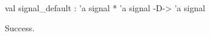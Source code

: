 \chklistingtrue
{}
\begin{ChkListingMsg}
val signal_default : 'a signal * 'a signal -D-> 'a signal 
\end{ChkListingMsg}
\begin{ChkListingErr}
Success.
\end{ChkListingErr}
